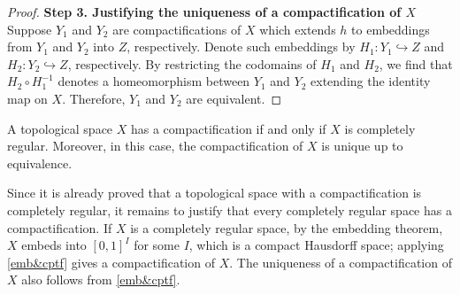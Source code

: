 \begin{proof}
    \indent\textbf{Step 3. Justifying the uniqueness of a compactification of $X$}\newline
    Suppose $Y_1$ and $Y_2$ are compactifications of $X$ which extends $h$ to embeddings from $Y_1$ and $Y_2$ into $Z$, respectively.
    Denote such embeddings by $H_1: Y_1\hookrightarrow Z$ and $H_2: Y_2\hookrightarrow Z$, respectively.
    By restricting the codomains of $H_1$ and $H_2$, we find that $H_2\circ H_1^{-1}$ denotes a homeomorphism between $Y_1$ and $Y_2$ extending the identity map on $X$.
    Therefore, $Y_1$ and $Y_2$ are equivalent.
\end{proof}
\begin{cor}
    A topological space $X$ has a compactification if and only if $X$ is completely regular.
    Moreover, in this case, the compactification of $X$ is unique up to equivalence.
\end{cor}
\begin{rmk}
    Since it is already proved that a topological space with a compactification is completely regular, it remains to justify that every completely regular space has a compactification.
    If $X$ is a completely regular space, by the embedding theorem, $X$ embeds into $[0, 1]^I$ for some $I$, which is a compact Hausdorff space; applying \cref{emb&cptf} gives a compactification of $X$.
    The uniqueness of a compactification of $X$ also follows from \cref{emb&cptf}.
\end{rmk}
